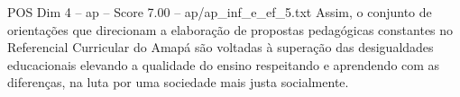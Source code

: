 \begin{textsample}{POS Dim 4 – ap – Score 7.00 – ap/ap\_inf\_e\_ef\_5.txt}
Assim, o conjunto de orientações que direcionam a elaboração de propostas pedagógicas constantes no Referencial Curricular do Amapá são voltadas à superação das desigualdades educacionais elevando a qualidade do ensino respeitando e aprendendo com as diferenças, na luta por uma sociedade mais justa socialmente.

\end{textsample}
